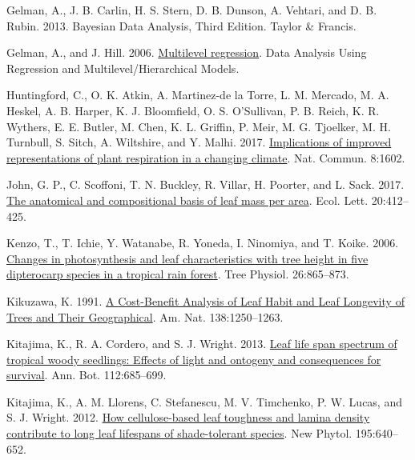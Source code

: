 \documentclass[
  12pt,
]{article}
\newlength{\cslhangindent}
\newlength{\cslentryspacingunit} %
\newenvironment{CSLReferences}[2] %
 {%
  \setlength{\parindent}{0pt}
  \ifodd #1
  \let\oldpar\par
  \def\par{\hangindent=\cslhangindent\oldpar}
  \fi
  \setlength{\parskip}{#2\cslentryspacingunit}
 }%
 {}
\begin{document}
\begin{CSLReferences}{1}{0}
\leavevmode{}%
Gelman, A., J. B. Carlin, H. S. Stern, D. B. Dunson, A. Vehtari, and D. B. Rubin. 2013. Bayesian {Data Analysis}, {Third Edition}. {Taylor \& Francis}.

\leavevmode{}%
Gelman, A., and J. Hill. 2006. \href{https://doi.org/10.1017/CBO9780511790942.014}{Multilevel regression}. Data Analysis Using Regression and Multilevel/Hierarchical Models.

\leavevmode{}%
Huntingford, C., O. K. Atkin, A. Martinez-de la Torre, L. M. Mercado, M. A. Heskel, A. B. Harper, K. J. Bloomfield, O. S. O'Sullivan, P. B. Reich, K. R. Wythers, E. E. Butler, M. Chen, K. L. Griffin, P. Meir, M. G. Tjoelker, M. H. Turnbull, S. Sitch, A. Wiltshire, and Y. Malhi. 2017. \href{https://doi.org/10.1038/s41467-017-01774-z}{Implications of improved representations of plant respiration in a changing climate}. Nat. Commun. 8:1602.

\leavevmode{}%
John, G. P., C. Scoffoni, T. N. Buckley, R. Villar, H. Poorter, and L. Sack. 2017. \href{https://doi.org/10.1111/ele.12739}{The anatomical and compositional basis of leaf mass per area}. Ecol. Lett. 20:412--425.

\leavevmode{}%
Kenzo, T., T. Ichie, Y. Watanabe, R. Yoneda, I. Ninomiya, and T. Koike. 2006. \href{https://doi.org/10.1093/treephys/26.7.865}{Changes in photosynthesis and leaf characteristics with tree height in five dipterocarp species in a tropical rain forest}. Tree Physiol. 26:865--873.

\leavevmode{}%
Kikuzawa, K. 1991. \href{https://doi.org/10.2307/2462519}{A {Cost}-{Benefit Analysis} of {Leaf Habit} and {Leaf Longevity} of {Trees} and {Their Geographical}}. Am. Nat. 138:1250--1263.

\leavevmode{}%
Kitajima, K., R. A. Cordero, and S. J. Wright. 2013. \href{https://doi.org/10.1093/aob/mct036}{Leaf life span spectrum of tropical woody seedlings: {Effects} of light and ontogeny and consequences for survival}. Ann. Bot. 112:685--699.

\leavevmode{}%
Kitajima, K., A. M. Llorens, C. Stefanescu, M. V. Timchenko, P. W. Lucas, and S. J. Wright. 2012. \href{https://doi.org/10.1111/j.1469-8137.2012.04203.x}{How cellulose-based leaf toughness and lamina density contribute to long leaf lifespans of shade-tolerant species}. New Phytol. 195:640--652.


\end{CSLReferences}
\end{document}
